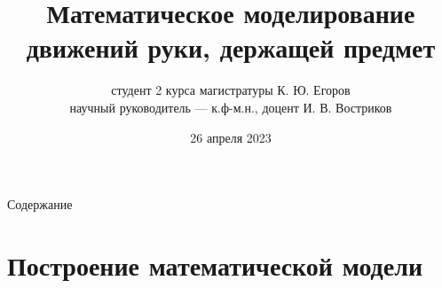 

\usepackage{amsmath}  %
\usepackage{amssymb}  %
\usepackage{graphicx}


\title[Магистерская диссертация]
        {Математическое моделирование движений руки, держащей предмет}
\author[К. Ю. Егоров]
        {студент 2 курса магистратуры К. Ю. Егоров\\
        научный руководитель --- к.ф-м.н., доцент И. В. Востриков}
\date{26 апреля 2023}


    \begin{frame}
        \titlepage
    \end{frame}

    \begin{frame}{Содержание}
        \tableofcontents
    \end{frame}


    \section{Построение математической модели}

